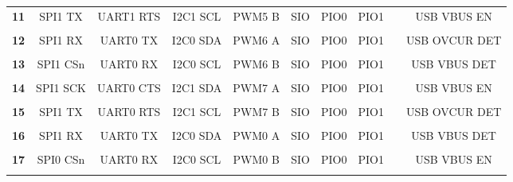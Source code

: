 \documentclass[a4paper,12pt,twoside]{article}
\begin{document}
\begin{center}
{\begin{tabular}{|c|*{9}{c|}}
			\textbf{11}   & SPI1 TX     & UART1 RTS   & I2C1 SCL    & PWM5 B      & SIO         & PIO0        & PIO1        &              & USB VBUS EN   \\
			              &             &             &             &             &             &             &             &              &               \\ \hline
			\textbf{12}   & SPI1 RX     & UART0 TX    & I2C0 SDA    & PWM6 A      & SIO         & PIO0        & PIO1        &              & USB OVCUR DET \\
			              &             &             &             &             &             &             &             &              &               \\ \hline
			\textbf{13}   & SPI1 CSn    & UART0 RX    & I2C0 SCL    & PWM6 B      & SIO         & PIO0        & PIO1        &              & USB VBUS DET  \\
			              &             &             &             &             &             &             &             &              &               \\ \hline
			\textbf{14}   & SPI1 SCK    & UART0 CTS   & I2C1 SDA    & PWM7 A      & SIO         & PIO0        & PIO1        &              & USB VBUS EN   \\
			              &             &             &             &             &             &             &             &              &               \\ \hline
			\textbf{15}   & SPI1 TX     & UART0 RTS   & I2C1 SCL    & PWM7 B      & SIO         & PIO0        & PIO1        &              & USB OVCUR DET \\
			              &             &             &             &             &             &             &             &              &               \\ \hline
			\textbf{16}   & SPI1 RX     & UART0 TX    & I2C0 SDA    & PWM0 A      & SIO         & PIO0        & PIO1        &              & USB VBUS DET  \\
			              &             &             &             &             &             &             &             &              &               \\ \hline
			\textbf{17}   & SPI0 CSn    & UART0 RX    & I2C0 SCL    & PWM0 B      & SIO         & PIO0        & PIO1        &              & USB VBUS EN   \\
			              &             &             &             &             &             &             &             &              &               \\ \hline

\end{tabular}}
\end{center}
\end{document}
